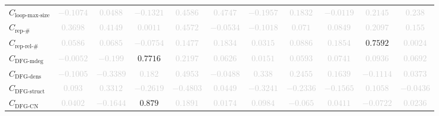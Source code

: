 \documentclass{standalone}
\newcommand{\loopmaxsizename}{\text{loop-max-size}}
\newcommand{\loopmaxsize}{C_{\loopmaxsizename}}
\newcommand{\repnumname}{\text{rep-\#}}
\newcommand{\repnum}{C_{\repnumname}}
\newcommand{\reprelnumname}{\text{rep-rel-\#}}
\newcommand{\reprelnum}{C_{\reprelnumname}}
\newcommand{\dfgmaxdegname}{\text{DFG-mdeg}}
\newcommand{\dfgmaxdeg}{C_{\dfgmaxdegname}}
\newcommand{\dfgdensname}{\text{DFG-dens}}
\newcommand{\dfgdens}{C_{\dfgdensname}}
\newcommand{\dfgstructname}{\text{DFG-struct}}
\newcommand{\dfgstruct}{C_{\dfgstructname}}
\newcommand{\dfgcycnumbername}{\text{DFG-CN}}
\newcommand{\dfgcycnumber}{C_{\dfgcycnumbername}}
\begin{document}
\begin{tabular}{lcccccccccc}
$\loopmaxsize$ & \textcolor{lightgray}{$-0.1074$} & \textcolor{lightgray}{$0.0488$} & \textcolor{lightgray}{$-0.1321$} & \textcolor{lightgray}{$0.4586$} & \textcolor{lightgray}{$0.4747$} & \textcolor{lightgray}{$-0.1957$} & \textcolor{lightgray}{$0.1832$} & \textcolor{lightgray}{$-0.0119$} & \textcolor{lightgray}{$0.2145$} & \textcolor{lightgray}{$0.238$} \\ 
$\repnum$ & \textcolor{lightgray}{$0.3698$} & \textcolor{lightgray}{$0.4149$} & \textcolor{lightgray}{$0.0011$} & \textcolor{lightgray}{$0.4572$} & \textcolor{lightgray}{$-0.0534$} & \textcolor{lightgray}{$-0.1018$} & \textcolor{lightgray}{$0.071$} & \textcolor{lightgray}{$0.0849$} & \textcolor{lightgray}{$0.2097$} & \textcolor{lightgray}{$0.155$} \\ 
$\reprelnum$ & \textcolor{lightgray}{$0.0586$} & \textcolor{lightgray}{$0.0685$} & \textcolor{lightgray}{$-0.0754$} & \textcolor{lightgray}{$0.1477$} & \textcolor{lightgray}{$0.1834$} & \textcolor{lightgray}{$0.0315$} & \textcolor{lightgray}{$0.0886$} & \textcolor{lightgray}{$0.1854$} & $0.7592$ & \textcolor{lightgray}{$0.0024$} \\ 
$\dfgmaxdeg$ & \textcolor{lightgray}{$-0.0052$} & \textcolor{lightgray}{$-0.199$} & $0.7716$ & \textcolor{lightgray}{$0.2197$} & \textcolor{lightgray}{$0.0626$} & \textcolor{lightgray}{$0.0151$} & \textcolor{lightgray}{$0.0593$} & \textcolor{lightgray}{$0.0741$} & \textcolor{lightgray}{$0.0936$} & \textcolor{lightgray}{$0.0692$} \\ 
$\dfgdens$ & \textcolor{lightgray}{$-0.1005$} & \textcolor{lightgray}{$-0.3389$} & \textcolor{lightgray}{$0.182$} & \textcolor{lightgray}{$0.4953$} & \textcolor{lightgray}{$-0.0488$} & \textcolor{lightgray}{$0.338$} & \textcolor{lightgray}{$0.2455$} & \textcolor{lightgray}{$0.1639$} & \textcolor{lightgray}{$-0.1114$} & \textcolor{lightgray}{$0.0373$} \\ 
$\dfgstruct$ & \textcolor{lightgray}{$0.093$} & \textcolor{lightgray}{$0.3312$} & \textcolor{lightgray}{$-0.2619$} & \textcolor{lightgray}{$-0.4803$} & \textcolor{lightgray}{$0.0449$} & \textcolor{lightgray}{$-0.3241$} & \textcolor{lightgray}{$-0.2336$} & \textcolor{lightgray}{$-0.1565$} & \textcolor{lightgray}{$0.1058$} & \textcolor{lightgray}{$-0.0436$} \\ 
$\dfgcycnumber$ & \textcolor{lightgray}{$0.0402$} & \textcolor{lightgray}{$-0.1644$} & $0.879$ & \textcolor{lightgray}{$0.1891$} & \textcolor{lightgray}{$0.0174$} & \textcolor{lightgray}{$0.0984$} & \textcolor{lightgray}{$-0.065$} & \textcolor{lightgray}{$0.0411$} & \textcolor{lightgray}{$-0.0722$} & \textcolor{lightgray}{$0.0236$} \\ 

\end{tabular}
\end{document}
